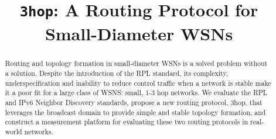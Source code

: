 \documentclass[conference]{IEEEtran}
\begin{document}
\title{\texttt{3hop}: A Routing Protocol for Small-Diameter WSNs}

\author{
\and
{}
}

\maketitle

\begin{abstract}
Routing and topology formation in small-diameter WSNs is a solved problem without a solution.
Despite the introduction of the RPL standard, its complexity, underspecification and inability to reduce control traffic when a network is stable make it a poor fit for a large class of WSNS: small, 1-3 hop networks.
We evaluate the RPL and IPv6 Neighbor Discovery standards, propose a new routing protocol, 3hop, that leverages the broadcast domain to provide simple and stable topology formation, and construct a measurement platform for evaluating these two routing protocols in real-world networks.
\end{abstract}

















\end{document}
